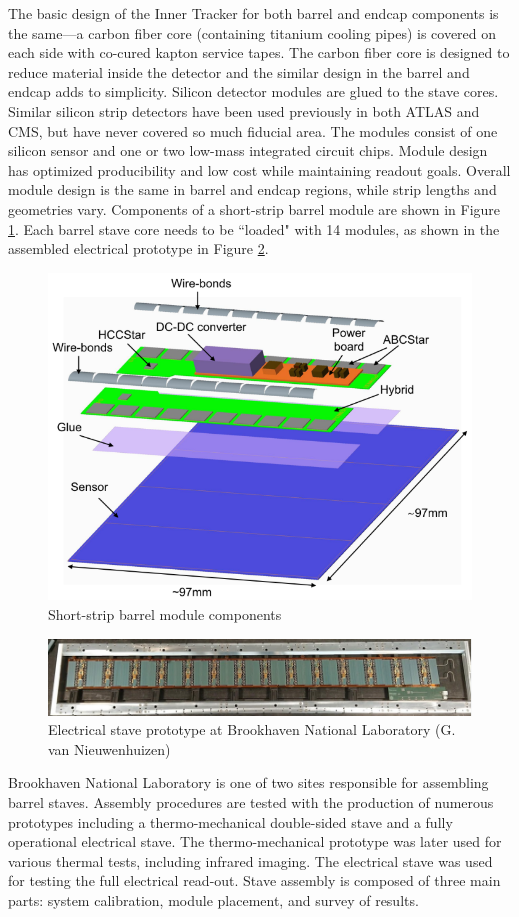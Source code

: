 The basic design of the Inner Tracker for both barrel and endcap components is the same---a carbon fiber core (containing titanium cooling pipes) is covered on each side with co-cured kapton service tapes. The carbon fiber core is designed to reduce material inside the detector and the similar design in the barrel and endcap adds to simplicity. Silicon detector modules are glued to the stave cores. Similar silicon strip detectors have been used previously in both ATLAS and CMS, but have never covered so much fiducial area. The modules consist of one silicon sensor and one or two low-mass integrated circuit chips. Module design has optimized producibility and low cost while maintaining readout goals. Overall module design is the same in barrel and endcap regions, while strip lengths and geometries vary. Components of a short-strip barrel module are shown in Figure \ref{fig:module}. Each barrel stave core needs to be ``loaded" with 14 modules, as shown in the assembled electrical prototype in Figure \ref{fig:stave}.

\begin{figure}[!h]
        \centering
    \includegraphics[width=.4\textwidth]{Pictures/ITkmodule.png}
    \caption{Short-strip barrel module components \cite{ITktech}}
    \label{fig:module}
\end{figure}
 
\begin{figure}[!h]
        \centering
    \includegraphics[width=.8\textwidth]{Pictures/electricalstave.png}
    \caption{Electrical stave prototype at Brookhaven National Laboratory (G. van Nieuwenhuizen)}
    \label{fig:stave}
\end{figure}

Brookhaven National Laboratory is one of two sites responsible for assembling barrel staves. Assembly procedures are tested with the production of numerous prototypes including a thermo-mechanical double-sided stave and a fully operational electrical stave. The thermo-mechanical prototype was later used for various thermal tests, including infrared imaging. The electrical stave was used for testing the full electrical read-out. Stave assembly is composed of three main parts: system calibration, module placement, and survey of results. 

